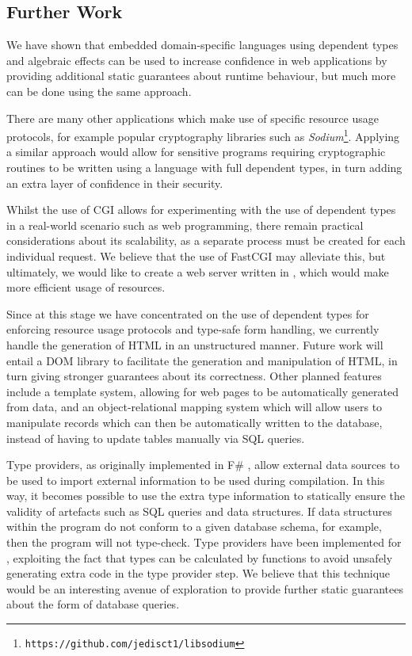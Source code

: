 \subsection{Further Work}

We have shown that embedded domain-specific languages using dependent types and
algebraic effects can be used to increase confidence in web applications by
providing additional static guarantees about runtime behaviour, but much more
can be done using the same approach.

There are many other applications which make use of specific resource usage
protocols, for example popular cryptography libraries such as
\textit{Sodium}\footnote{\texttt{https://github.com/jedisct1/libsodium}}.
Applying a similar approach would allow for sensitive programs requiring
cryptographic routines to be written using a language with full dependent
types, in turn adding an extra layer of confidence in their security. 

Whilst the use of CGI allows for experimenting with the use of dependent types
in a real-world scenario such as web programming, there remain practical
considerations about its scalability, as a separate process must be created for
each individual request. We believe that the use of FastCGI may alleviate this,
but ultimately, we would like to create a web server written in \idris{}, which
would make more efficient usage of resources. 

Since at this stage we have concentrated on the use of dependent types for
enforcing resource usage protocols and type-safe form handling, we currently
handle the generation of HTML in an unstructured manner. Future work will
entail a DOM library to facilitate the generation and manipulation of HTML, in
turn giving stronger guarantees about its correctness. Other planned features
include a template system, allowing for web pages to be automatically generated
from data, and an object-relational mapping system which will allow users to
manipulate records which can then be automatically written to the database,
instead of having to update tables manually via SQL queries.

Type providers, as originally implemented in F\# \cite{msr:tp}, allow external data sources to be used to import
external information to be used during compilation. 
In this way, it becomes possible to use the extra type
information to statically ensure the validity of artefacts such as SQL
queries and data structures. If data structures within the program do not
conform to a given database schema, for example, then the program will not
type-check.  Type providers have been implemented for 
\idris{} 
\cite{christiansen:dtp}, exploiting the fact that types can be
calculated by functions to avoid unsafely generating extra code in the type provider
step. We believe that this technique would be an interesting avenue of exploration to provide further static guarantees about the form of database queries.

